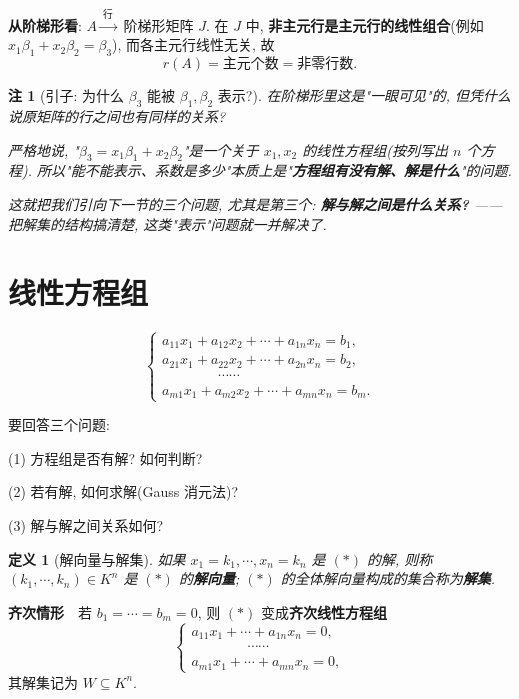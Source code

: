 \documentclass[UTF8,11pt]{ctexart}
\theoremstyle{cnthm}
\newtheorem{defn}[thm]{定义}
\newtheorem{rem}[thm]{注}
\begin{document}
\textbf{从阶梯形看}: $A\xrightarrow{\ \text{行}\ }$ 阶梯形矩阵 $J$. 在 $J$ 中, \textbf{非主元行是主元行的线性组合}(例如 $x_1\beta_1+x_2\beta_2=\beta_3$), 而各主元行线性无关, 故
\[
r(A)=\text{主元个数}=\text{非零行数}.
\]

\begin{rem}[引子: 为什么 $\beta_3$ 能被 $\beta_1,\beta_2$ 表示?]
在阶梯形里这是"一眼可见"的, 但凭什么说原矩阵的行之间也有同样的关系?

严格地说, "$\beta_3=x_1\beta_1+x_2\beta_2$"是一个关于 $x_1,x_2$ 的线性方程组(按列写出 $n$ 个方程). 所以"能不能表示、系数是多少"本质上是"\textbf{方程组有没有解、解是什么}"的问题.

这就把我们引向下一节的三个问题, 尤其是第三个: \textbf{解与解之间是什么关系?} —— 把解集的结构搞清楚, 这类"表示"问题就一并解决了.
\end{rem}

\section{线性方程组}

\begin{equation*}
\begin{cases}
a_{11}x_1+a_{12}x_2+\cdots+a_{1n}x_n=b_1,\\
a_{21}x_1+a_{22}x_2+\cdots+a_{2n}x_n=b_2,\\
\qquad\qquad\cdots\cdots\\
a_{m1}x_1+a_{m2}x_2+\cdots+a_{mn}x_n=b_m.
\end{cases}
\tag{$*$}
\end{equation*}

要回答三个问题:

(1) 方程组是否有解? 如何判断?

(2) 若有解, 如何求解(Gauss 消元法)?

(3) 解与解之间关系如何?

\begin{defn}[解向量与解集]
如果 $x_1=k_1,\cdots,x_n=k_n$ 是 $(*)$ 的解, 则称 $(k_1,\cdots,k_n)\in K^n$ 是 $(*)$ 的\textbf{解向量}; $(*)$ 的全体解向量构成的集合称为\textbf{解集}.
\end{defn}

\textbf{齐次情形}　若 $b_1=\cdots=b_m=0$, 则 $(*)$ 变成\textbf{齐次线性方程组}
\begin{equation*}
\begin{cases}
a_{11}x_1+\cdots+a_{1n}x_n=0,\\
\qquad\qquad\cdots\cdots\\
a_{m1}x_1+\cdots+a_{mn}x_n=0,
\end{cases}
\tag{$**$}
\end{equation*}
其解集记为 $W\subseteq K^n$.
\end{document}
